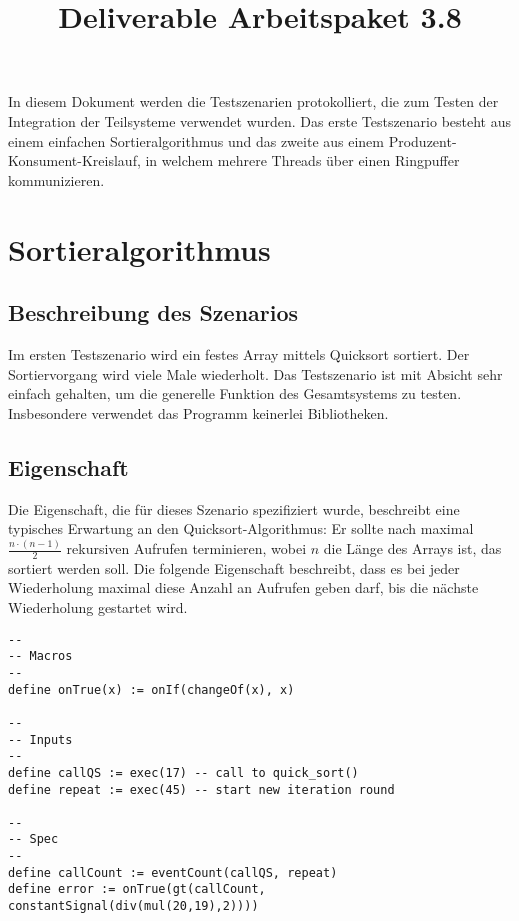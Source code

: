 \documentclass{article}
\title{Deliverable Arbeitspaket 3.8}
\title{\thetitle}
\begin{document}
\maketitle

In diesem Dokument werden die Testszenarien protokolliert, die zum Testen der Integration der Teilsysteme verwendet wurden. Das erste Testszenario besteht aus einem einfachen Sortieralgorithmus und das zweite aus einem Produzent-Konsument-Kreislauf, in welchem mehrere Threads über einen Ringpuffer kommunizieren.

\section{Sortieralgorithmus}

\subsection{Beschreibung des Szenarios}

Im ersten Testszenario wird ein festes Array mittels Quicksort sortiert. Der Sortiervorgang wird viele Male wiederholt. Das Testszenario ist mit Absicht sehr einfach gehalten, um die generelle Funktion des Gesamtsystems zu testen.
Insbesondere verwendet das Programm keinerlei Bibliotheken.

\subsection{Eigenschaft}

Die Eigenschaft, die für dieses Szenario spezifiziert wurde, beschreibt eine typisches Erwartung an den Quicksort-Algorithmus: Er sollte nach maximal $\frac{n \cdot (n - 1)}{2}$ rekursiven Aufrufen terminieren, wobei $n$ die Länge des Arrays ist, das sortiert werden soll. Die folgende Eigenschaft beschreibt, dass es bei jeder Wiederholung maximal diese Anzahl an Aufrufen geben darf, bis die nächste Wiederholung gestartet wird.

\begin{lstlisting}[language=tessla+salt]
--
-- Macros
--
define onTrue(x) := onIf(changeOf(x), x)

--
-- Inputs
--
define callQS := exec(17) -- call to quick_sort()
define repeat := exec(45) -- start new iteration round

--
-- Spec
--
define callCount := eventCount(callQS, repeat)
define error := onTrue(gt(callCount, constantSignal(div(mul(20,19),2))))
\end{lstlisting}
\end{document}
